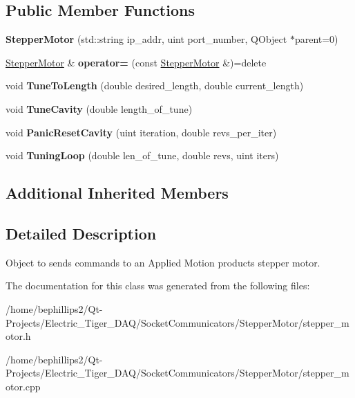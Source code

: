 \subsection*{Public Member Functions}
\begin{DoxyCompactItemize}
\item 
{\bfseries Stepper\+Motor} (std\+::string ip\+\_\+addr, uint port\+\_\+number, Q\+Object $\ast$parent=0)\hypertarget{class_stepper_motor_a6452f15d157117668e70de3e6b2b0b92}{}\label{class_stepper_motor_a6452f15d157117668e70de3e6b2b0b92}

\item 
\hyperlink{class_stepper_motor}{Stepper\+Motor} \& {\bfseries operator=} (const \hyperlink{class_stepper_motor}{Stepper\+Motor} \&)=delete\hypertarget{class_stepper_motor_aeeceb8eefbcffef0cb0c2b742ffe3603}{}\label{class_stepper_motor_aeeceb8eefbcffef0cb0c2b742ffe3603}

\item 
void {\bfseries Tune\+To\+Length} (double desired\+\_\+length, double current\+\_\+length)\hypertarget{class_stepper_motor_a5170955211342f0234e83897f552bec8}{}\label{class_stepper_motor_a5170955211342f0234e83897f552bec8}

\item 
void {\bfseries Tune\+Cavity} (double length\+\_\+of\+\_\+tune)\hypertarget{class_stepper_motor_a94ae4b10d58ea4dde277c05acf444bdf}{}\label{class_stepper_motor_a94ae4b10d58ea4dde277c05acf444bdf}

\item 
void {\bfseries Panic\+Reset\+Cavity} (uint iteration, double revs\+\_\+per\+\_\+iter)\hypertarget{class_stepper_motor_a260af15a346488150de82fa3801df94c}{}\label{class_stepper_motor_a260af15a346488150de82fa3801df94c}

\item 
void {\bfseries Tuning\+Loop} (double len\+\_\+of\+\_\+tune, double revs, uint iters)\hypertarget{class_stepper_motor_a6e140a11cb19bac6819978b5bb6d5a4d}{}\label{class_stepper_motor_a6e140a11cb19bac6819978b5bb6d5a4d}

\end{DoxyCompactItemize}
\subsection*{Additional Inherited Members}


\subsection{Detailed Description}
Object to sends commands to an Applied Motion products stepper motor. 

The documentation for this class was generated from the following files\+:\begin{DoxyCompactItemize}
\item 
/home/bephillips2/\+Qt-\/\+Projects/\+Electric\+\_\+\+Tiger\+\_\+\+D\+A\+Q/\+Socket\+Communicators/\+Stepper\+Motor/stepper\+\_\+motor.\+h\item 
/home/bephillips2/\+Qt-\/\+Projects/\+Electric\+\_\+\+Tiger\+\_\+\+D\+A\+Q/\+Socket\+Communicators/\+Stepper\+Motor/stepper\+\_\+motor.\+cpp\end{DoxyCompactItemize}
